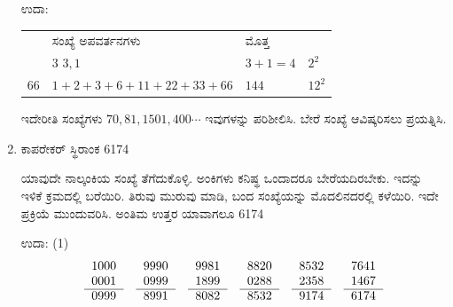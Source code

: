 \begin{enumerate}
ಉದಾ:

\begin{tabular}[t]{llll}
& ಸಂಖ್ಯೆ  \quad ಅಪವರ್ತನಗಳು & ಮೊತ್ತ & \\
 & $3$ \quad\qquad $3, 1$ & $3 + 1 = 4$ & $2^{2}$\\
$66$ & $1+2+3+6+11+22+33+66$ & $144$ & $12^{2}$
\end{tabular}

\vskip 0.3cm
ಇದೇರೀತಿ ಸಂಖ್ಯೆಗಳು $70, 81, 1501, 400 \cdots$ ಇವುಗಳನ್ನು ಪರಿಶೀಲಿಸಿ. ಬೇರೆ ಸಂಖ್ಯೆ ಆವಿಷ್ಕರಿಸಲು ಪ್ರಯತ್ನಿಸಿ. 

\item ಕಾಪರೇಕರ್ ಸ್ಥಿರಾಂಕ 6174

ಯಾವುದೇ ನಾಲ್ಕಂಕಿಯ ಸಂಖ್ಯೆ ತೆಗೆದುಕೊಳ್ಳಿ. ಅಂಕಿಗಳು ಕನಿಷ್ಥ ಒಂದಾದರೂ ಬೇರೆಯದಿರಬೇಕು. ಇದನ್ನು ಇಳಿಕೆ ಕ್ರಮದಲ್ಲಿ ಬರೆಯಿರಿ. ತಿರುವು ಮುರುವು ಮಾಡಿ, ಬಂದ ಸಂಖ್ಯೆಯನ್ನು ಮೊದಲಿನದರಲ್ಲಿ ಕಳೆಯಿರಿ. ಇದೇ ಪ್ರಕ್ರಿಯೆ ಮುಂದುವರಿಸಿ. ಅಂತಿಮ ಉತ್ತರ ಯಾವಾಗಲೂ 6174

ಉದಾ: (1)
\begin{equation*}
\begin{tabular}[t]{r}
1000 \\
0001\\\cline{1-1} 
0999
\end{tabular}
\quad
\begin{tabular}[t]{r}
9990\\ 
0999\\\cline{1-1} 
8991
\end{tabular}
\quad
\begin{tabular}[t]{r}
9981\\ 
1899\\\cline{1-1} 
8082
\end{tabular}
\quad
\begin{tabular}[t]{r}
8820\\ 
0288\\\cline{1-1} 
8532
\end{tabular}
\quad
\begin{tabular}[t]{r}
8532\\ 
2358\\\cline{1-1} 
9174
\end{tabular}
\quad
\begin{tabular}[t]{r}
7641\\ 
1467\\\cline{1-1} 
6174
\end{tabular}
\end{equation*}


\end{enumerate}
